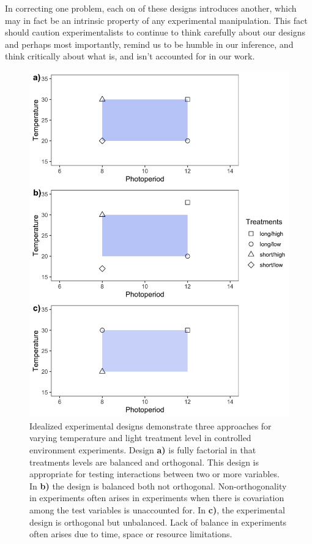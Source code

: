 \documentclass[11pt]{article}
\begin{document}
In correcting one problem, each on of these designs introduces another, which may in fact be an intrinsic property of any experimental manipulation. This fact should caution experimentalists to continue to think carefully about our designs and perhaps most importantly, remind us to be humble in our inference, and think critically about what is, and isn't accounted for in our work. 


\begin{figure}[h!]
    \centering
 \includegraphics[width=.8\textwidth]{..//Plots/periodicity_figures/orthog.jpeg}
    \caption{Idealized experimental designs demonstrate three approaches for varying temperature and light treatment level in controlled environment experiments. Design \textbf{a)} is fully factorial in that treatments levels are balanced and orthogonal. This design is appropriate for testing interactions between two or more variables. In \textbf{b)} the design is balanced both not orthogonal. Non-orthogonality in experiments often arises in experiments when there is covariation among the test variables is unaccounted for. In \textbf{c)}, the experimental design is orthogonal but unbalanced. Lack of balance in experiments often arises due to time, space or resource limitations. }
    \label{fig:examp}
\end{figure}
\end{document}
